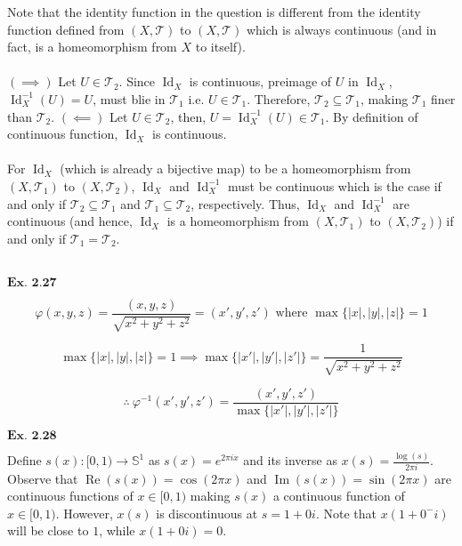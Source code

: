 \documentclass{article}
\begin{document}
Note that the identity function in the question is different from the identity function defined from $(X,\mathcal{T})$ to $(X,\mathcal{T})$ which is always continuous (and in fact, is a homeomorphism from $X$ to itself).\\~\\

$(\implies)$ Let $U \in \mathcal{T}_{2}$. Since $\operatorname{Id}_{X}$ is continuous, preimage of $U$ in $\operatorname{Id}_{X}$, $\operatorname{Id}_{X}^{-1}(U) = U$, must blie in $\mathcal{T}_1$ i.e. $U \in \mathcal{T}_1$. Therefore, $\mathcal{T}_2 \subseteq \mathcal{T}_1$, making $\mathcal{T}_1$ finer than $\mathcal{T}_2$. $(\impliedby)$ Let $U \in \mathcal{T}_2$, then, $U = \operatorname{Id}_{X}^{-1}(U) \in \mathcal{T}_1$. By definition of continuous function, $\operatorname{Id}_{X}$ is continuous.\\~\\

For $\operatorname{Id}_{X}$ (which is already a bijective map) to be a homeomorphism from $(X,\mathcal{T}_1)$ to $(X,\mathcal{T}_2)$, $\operatorname{Id}_{X}$ and $\operatorname{Id}_{X}^{-1}$ must be continuous which is the case if and only if $\mathcal{T}_2 \subseteq \mathcal{T}_1$ and $\mathcal{T}_1 \subseteq \mathcal{T}_2$, respectively. Thus, $\operatorname{Id}_{X}$ and $\operatorname{Id}_{X}^{-1}$ are continuous (and hence, $\operatorname{Id}_{X}$ is a homeomorphism from $(X,\mathcal{T}_1)$ to $(X,\mathcal{T}_2)$) if and only if $\mathcal{T}_1 = \mathcal{T}_2$.\\~\\

\vspace{0.2in}

${\textbf{Ex. 2.27}}$

$$\varphi(x,y,z) = \frac{(x,y,z)}{\sqrt{x^2+y^2+z^2}} = (x',y',z') \text{ where } \max\{|x|,|y|,|z|\}=1$$

$$\max\{|x|,|y|,|z|\}=1 \implies \max\{|x'|,|y'|,|z'|\}=\frac{1}{\sqrt{x^2+y^2+z^2}}$$

$$\therefore\ \varphi^{-1}(x',y',z') = \frac{(x',y',z')}{\max\{|x'|,|y'|,|z'|\}}$$

\vspace{0.2in}

${\textbf{Ex. 2.28}}$

Define $s(x):[0,1)\rightarrow \mathbb{S}^1$ as $s(x) = e^{2\pi ix}$ and its inverse as $x(s) = \frac{\log(s)}{2\pi i}$. Observe that $\operatorname{Re}(s(x)) = \cos(2\pi x)$ and $\operatorname{Im}(s(x)) = \sin(2\pi x)$ are continuous functions of $x \in [0,1)$ making $s(x)$ a continuous function of $x \in [0,1)$. However, $x(s)$ is discontinuous at $s=1+0i$. Note that $x(1+0^{-}i)$ will be close to $1$, while  $x(1+0i) = 0$.
\end{document}

